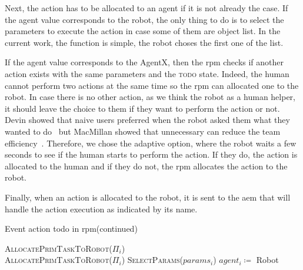\documentclass[a4paper,11pt,twoside]{StyleThese}
\begin{document}
Next, the action has to be allocated to an agent if it is not already the case. If the agent value corresponds to the robot, the only thing to do is to select the parameters to execute the action in case some of them are object list. In the current work, the function is simple, the robot choses the first one of the list. 

If the agent value corresponds to the AgentX, then the \acrshort{rpm} checks if another action exists with the same parameters and the \textsc{todo} state. Indeed, the human cannot perform two actions at the same time so the \acrshort{rpm} can allocated one to the robot. In case there is no other action, as we think the robot as a human helper, it should leave the choice to them if they want to perform the action or not. Devin showed that naive users preferred when the robot asked them what they wanted to do~\cite{devin_2017_decisions} but MacMillan \etal showed that unnecessary can reduce the team efficiency~\cite{macmillan_2004_communication}. Therefore, we chose the adaptive option, where the robot waits a few seconds to see if the human starts to perform the action. If they do, the action is allocated to the human and if they do not, the \acrshort{rpm} allocates the action to the robot. 

Finally, when an action is allocated to the robot, it is sent to the \acrlong{aem} that will handle the action execution as indicated by its name.


\begin{algorithm}[!htb]
	\ContinuedFloat
	\caption{Event action todo in \acrshort{rpm}(continued)}
	\begin{algorithmic}
			\State \textsc{AllocatePrimTaskToRobot($\Pi_i$)}
		\Else
			\\
			\EndWhile
				\State \textsc{AllocatePrimTaskToRobot($\Pi_i$)}
			\EndIf
		\EndIf
	\EndFunction
	\Statex
		\State \textsc{SelectParams($params_i$)}
		\State $agent_i \coloneqq$ Robot
	\EndFor
	\EndFunction
	\end{algorithmic}
\end{algorithm}
\end{document}
